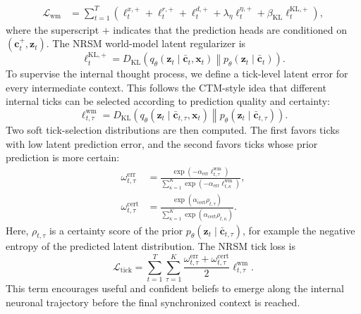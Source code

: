 \documentclass{article}
\begin{document}
\begin{align}
\mathcal L_{\mathrm{wm}}
&=
\sum_{t=1}^{T}
\left(
\ell^{x,+}_{t}
+\ell^{r,+}_{t}
+\ell^{d,+}_{t}
+\lambda_{\eta}\ell^{\eta,+}_{t}
+\beta_{\mathrm{KL}}\ell^{\mathrm{KL},+}_{t}
\right),
\label{eq:nrsm_wm_loss}
\end{align}
where the superscript $+$ indicates that the prediction heads are conditioned on $(\mathbf c_t^+,\mathbf z_t)$. The NRSM world-model latent regularizer is
\begin{equation}
\ell^{\mathrm{KL},+}_{t}
=
D_{\mathrm{KL}}\!\left(
q_{\theta}(\mathbf z_t\mid\bar{\mathbf c}_t,\mathbf x_t)
\middle\|
p_{\theta}(\mathbf z_t\mid\bar{\mathbf c}_t)
\right).
\label{eq:nrsm_wm_kl_loss}
\end{equation}
To supervise the internal thought process, we define a tick-level latent error for every intermediate context. This follows the CTM-style idea that different internal ticks can be selected according to prediction quality and certainty:
\begin{equation}
\ell^{\mathrm{wm}}_{t,\tau}
=
D_{\mathrm{KL}}\!\left(
q_{\theta}(\mathbf z_t\mid\bar{\mathbf c}_{t,\tau},\mathbf x_t)
\middle\|
p_{\theta}(\mathbf z_t\mid\bar{\mathbf c}_{t,\tau})
\right).
\label{eq:tick_world_model_error}
\end{equation}
Two soft tick-selection distributions are then computed. The first favors ticks with low latent prediction error, and the second favors ticks whose prior prediction is more certain:
\begin{align}
\omega^{\mathrm{err}}_{t,\tau}
&=
\frac{\exp(-\alpha_{\mathrm{err}}\ell^{\mathrm{wm}}_{t,\tau})}
{\sum_{\kappa=1}^{K}
\exp(-\alpha_{\mathrm{err}}\ell^{\mathrm{wm}}_{t,\kappa})},
\label{eq:error_tick_weight}\\
\omega^{\mathrm{cert}}_{t,\tau}
&=
\frac{\exp(\alpha_{\mathrm{cert}}\rho_{t,\tau})}
{\sum_{\kappa=1}^{K}
\exp(\alpha_{\mathrm{cert}}\rho_{t,\kappa})}.
\label{eq:certainty_tick_weight}
\end{align}
Here, $\rho_{t,\tau}$ is a certainty score of the prior $p_{\theta}(\mathbf z_t\mid\bar{\mathbf c}_{t,\tau})$, for example the negative entropy of the predicted latent distribution. The NRSM tick loss is
\begin{equation}
\mathcal L_{\mathrm{tick}}
=
\sum_{t=1}^{T}\sum_{\tau=1}^{K}
\frac{
\omega^{\mathrm{err}}_{t,\tau}
+
\omega^{\mathrm{cert}}_{t,\tau}
}{2}
\ell^{\mathrm{wm}}_{t,\tau}.
\label{eq:nrsm_tick_loss}
\end{equation}
This term encourages useful and confident beliefs to emerge along the internal neuronal trajectory before the final synchronized context is reached.
\end{document}
